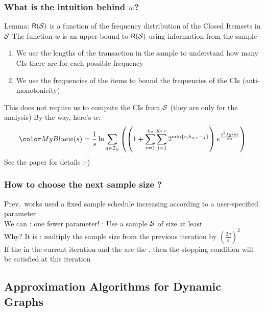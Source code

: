 \begin{frame}
  \frametitle{What is the intuition behind $w$?}
  Lemma: $\mathsf{R}({\cal S})$ is a function of the frequency distribution of the
  Closed Itemsets in ${\cal S}$
  \vfill
  The function $w$ is an upper bound to $\mathsf{R}({\cal S})$ using information from the sample
  \begin{enumerate}
    \item We use the lengths of the transaction in the sample to understand
      how many CIs there are for each possible frequency
    \item We use the frequencies of the items to bound the frequencies of
      the CIs (anti-monotonicity)
  \end{enumerate}
  This does not require us to compute the CIs from ${\cal S}$ (they are only for the
  analysis)
  \vfill
  \pause
  By the way, here's $w$:
  \[
    \inblue{
    w(s) =
    \frac{1}{s}\ln\displaystyle\sum_{a\in\mathcal{I}_\Sam}\left(\left(1+\displaystyle\sum_{r=1}^{\chi_a}\displaystyle\sum_{j=1}^{g_{a,r}}2^{\min\{r,h_{a,r}-j\}}\right)e^{\frac{s^2f_\Sam(a)}{2n}}\right)
    }
  \]
  See the paper for details :-)
\end{frame}

\begin{frame}
  \frametitle{How to choose the next sample size ?}
  Prev.~works used a fixed sample schedule increasing according to a user-specified parameter\\
  \quad We can : one fewer parameter!
  \vfill
  : Use a sample ${\cal S}$ of size at least
  \\
  \quad Why? It is 
  \vfill
  : multiply the sample size from the previous
  iteration by $\displaystyle\left(\frac{2\eta}{\varepsilon}\right)^2$\\
   If the  in the current iteration
  and the  are the , then the stopping condition will be satisfied at this iteration
\end{frame}

\subsection{Approximation Algorithms for Dynamic Graphs}

